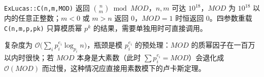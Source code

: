 \texttt{ExLucas::C(n,m,MOD)} 返回 $\binom nm\bmod MOD$，$n,m$ 可达 $10^{18}$，$MOD$ 为 $10^{18}$ 以内的任意正整数；$m<0$ 或 $m>n$ 返回 $0$，$MOD=1$ 时恒返回 $0$。四参数重载 \texttt{C(n,m,p,pk)} 只算模质幂 $p^k$ 的结果，需要单独用时可直接调用。

复杂度为 $\mathcal{O}\big(\sum_i p_i^{e_i}\log_{p_i}n\big)$，瓶颈是模 $p_i^{e_i}$ 的预处理：$MOD$ 的质幂因子在一百万以内时很快；若 $MOD$ 本身是大素数（此时 $\sum p_i^{e_i}=MOD$）会退化成 $\mathcal{O}(MOD)$ 而过慢，这种情况应直接用素数模下的卢卡斯定理。
